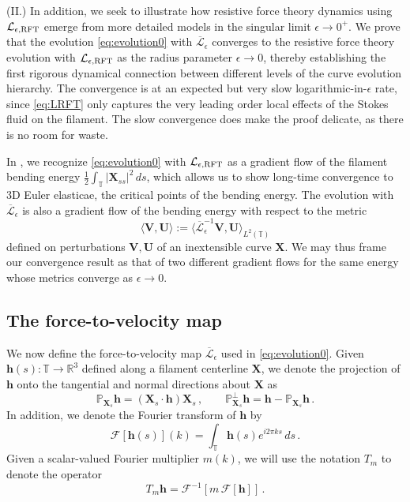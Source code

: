 \documentclass[11pt,reqno]{amsart}
\newcommand{\R}{\mathbb{R}}
\newcommand{\T}{\mathbb{T}}
\renewcommand{\P}{\mathbb{P}}
\newcommand{\X}{\bm{X}}
\newcommand{\abs}[1]{\left\lvert #1 \right\rvert}
\newcommand{\mc}[1]{\mathcal{#1}}
\numberwithin{equation}{section}
\theoremstyle{definition}
\begin{document}
(II.) In addition, we seek to illustrate how resistive force theory dynamics using $\mc{L}_{\epsilon,{\rm RFT}}$ emerge from more detailed models in the singular limit $\epsilon\to 0^+$. We prove that the evolution \eqref{eq:evolution0} with $\overline{\mc{L}}_\epsilon$ converges to the resistive force theory evolution with $\mc{L}_{\epsilon,{\rm RFT}}$ as the radius parameter $\epsilon\to 0$, thereby establishing the first rigorous dynamical connection between different levels of the curve evolution hierarchy. The convergence is at an expected but very slow logarithmic-in-$\epsilon$ rate, since \eqref{eq:LRFT} only captures the very leading order local effects of the Stokes fluid on the filament. The slow convergence does make the proof delicate, as there is no room for waste. 


In \cite{albritton2025rods}, we recognize \eqref{eq:evolution0} with $\mc{L}_{\epsilon,{\rm RFT}}$ as a gradient flow of the filament bending energy $\frac{1}{2}\int_\T\abs{\X_{ss}}^2\,ds$, which allows us to show long-time convergence to 3D Euler elasticae, the critical points of the bending energy. The evolution with $\overline{\mc{L}}_\epsilon$ is also a gradient flow of the bending energy with respect to the metric 
\begin{equation}
  \langle \bm{V},\bm{U}\rangle := \langle \overline{\mc{L}}_\epsilon^{-1}\bm{V},\bm{U}\rangle_{L^2(\T)}
\end{equation}
defined on perturbations $\bm{V},\bm{U}$ of an inextensible curve $\X$. We may thus frame our convergence result as that of two different gradient flows for the same energy whose metrics converge as $\epsilon \to 0$. 





\subsection{The force-to-velocity map}
We now define the force-to-velocity map $\overline{\mc{L}}_\epsilon$ used in \eqref{eq:evolution0}. Given $\bm{h}(s):\T\to\R^3$ defined along a filament centerline $\X$, we denote the projection of $\bm{h}$ onto the tangential and normal directions about $\X$ as 
\begin{equation}\label{eq:projections}
  \P_{\X_s}\bm{h} = (\X_s\cdot\bm{h}) \X_s\,, \qquad
  \P_{\X_s}^\perp\bm{h} = \bm{h} - \P_{\X_s}\bm{h}\,.
\end{equation}
%
%
In addition, we denote the Fourier transform of $\bm{h}$ by
\begin{equation}
  \mc{F}[\bm{h}(s)](k) = \int_\T \bm{h}(s)e^{i2\pi ks}\,ds\,.
\end{equation}
%
Given a scalar-valued Fourier multiplier $m(k)$, we will use the notation $T_m$ to denote the operator 
\begin{equation}\label{eq:Tmh}
  T_m\bm{h} = \mc{F}^{-1}[m\,\mc{F}[\bm{h}]] \,.
\end{equation}
\end{document}
